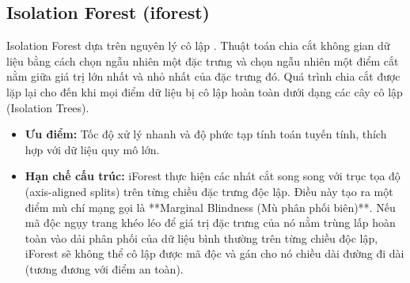 ﻿\documentclass[../main.tex]{subfiles}
\begin{document}
\subsection{Isolation Forest (iforest)}
Isolation Forest dựa trên nguyên lý cô lập \cite{liu2008isolation}. Thuật toán chia cắt không gian dữ liệu bằng cách chọn ngẫu nhiên một đặc trưng và chọn ngẫu nhiên một điểm cắt nằm giữa giá trị lớn nhất và nhỏ nhất của đặc trưng đó. Quá trình chia cắt được lặp lại cho đến khi mọi điểm dữ liệu bị cô lập hoàn toàn dưới dạng các cây cô lập (Isolation Trees). 
\begin{itemize}
    \item \textbf{Ưu điểm:} Tốc độ xử lý nhanh và độ phức tạp tính toán tuyến tính, thích hợp với dữ liệu quy mô lớn.
    \item \textbf{Hạn chế cấu trúc:} iForest thực hiện các nhát cắt song song với trục tọa độ (axis-aligned splits) trên từng chiều đặc trưng độc lập. Điều này tạo ra một điểm mù chí mạng gọi là **Marginal Blindness (Mù phân phối biên)**. Nếu mã độc ngụy trang khéo léo để giá trị đặc trưng của nó nằm trùng lấp hoàn toàn vào dải phân phối của dữ liệu bình thường trên từng chiều độc lập, iForest sẽ không thể cô lập được mã độc và gán cho nó chiều dài đường đi dài (tương đương với điểm an toàn).
\end{itemize}
\end{document}
